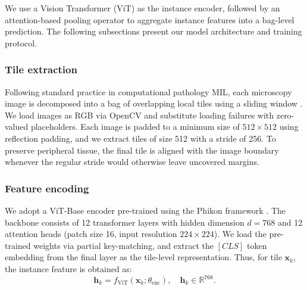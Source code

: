 \documentclass[journal]{IEEEtran}
\theoremstyle{remark}
\providecommand{\citep}[1]{\cite{#1}}
\begin{document}

We use a Vision Transformer (ViT) \cite{dosovitskiy2020image} as the instance encoder, followed by an attention-based pooling operator \cite{ilse2018attention} to aggregate instance features into a bag-level prediction. The following subsections present our model architecture and training protocol.

\subsubsection{Tile extraction}

Following standard practice in computational pathology MIL, each microscopy image is decomposed into a bag of overlapping local tiles using a sliding window \cite{campanella2019clinical,lu2021data}. We load images as RGB via OpenCV \cite{bradski2000opencv} and substitute loading failures with zero-valued placeholders. Each image is padded to a minimum size of $512\times512$ using reflection padding, and we extract tiles of size 512 with a stride of 256. To preserve peripheral tissue, the final tile is aligned with the image boundary whenever the regular stride would otherwise leave uncovered margins.

\subsubsection{Feature encoding}

We adopt a ViT-Base encoder pre-trained using the Phikon framework \citep{filiot2023scaling}. The backbone consists of 12 transformer layers with hidden dimension \( d = 768 \) and 12 attention heads (patch size 16, input resolution \(224\times224\)). We load the pre-trained weights via partial key-matching, and extract the \([CLS]\) token embedding from the final layer as the tile-level representation. Thus, for tile \(\mathbf{x}_k\), the instance feature is obtained as:
\begin{equation*}
    \mathbf{h}_k = f_{\text{ViT}}(\mathbf{x}_k; \theta_{\text{enc}}), \quad \mathbf{h}_k \in \mathbb{R}^{768}.
\end{equation*}
\end{document}
